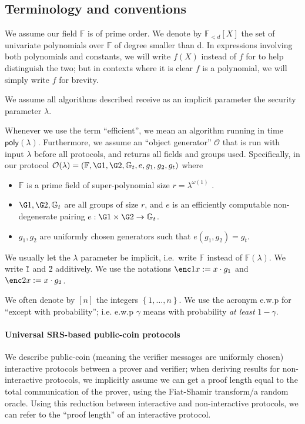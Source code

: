 \documentclass[11pt]{article} %
\newcommand{\Gt}{\ensuremath{{\mathbb G}_t}\xspace}
\newcommand{\F}{\ensuremath{\mathbb F}\xspace}
\newcommand{\defeq}{:=}
\newcommand{\set}[1]{\ensuremath{\left\{#1\right\}}\xspace}
\newcommand{\polysofdeg}[1]{\ensuremath{\F_{< #1}[X]}\xspace}
\newcommand{\obgen}{\ensuremath{\mathcal O}\xspace}
\newcommand{\poly}{\ensuremath{\mathsf{poly(\lambda)}}\xspace}
\begin{document}
\subsection{Terminology and conventions}\label{sec:terminology}
We assume our field \F is of prime order.
We denote by \polysofdeg{d} the set of univariate polynomials over \F of degree smaller than d.
In expressions involving both polynomials and constants, we will write $f(X)$ instead of $f$ for
to help distinguish the two; but in contexts where it is clear $f$ is a polynomial, we will simply write $f$ for brevity.

We assume all algorithms described receive as an implicit parameter the security parameter $\lambda$.

Whenever we use the term “efficient”, we mean an algorithm running in time \poly. Furthermore,
we assume an “object generator” \obgen that is run with input $\lambda$ before all protocols, and returns all fields and groups used. Specifically, in our protocol $\obgen(\lambda) = (\F, \G1, \G2, \Gt, e, g_1, g_2,g_t)$ where
\begin{itemize}
\item \F is a prime field of super-polynomial size $r = \lambda^{\omega(1)}$
.
\item $\G1,\G2,\Gt$ are all groups of size $r$, and $e$ is an efficiently computable non-degenerate pairing
$e : \G1 \times \G2 \to \Gt$.
\item $g_1,g_2$ are uniformly chosen generators such that $e(g_1, g_2) = g_t$.
\end{itemize}
We usually let the $\lambda$ parameter be implicit, i.e.\ write \F instead of $\F(\lambda)$.
We write \G1 and \G2 additively. We use the notations $\enc1{x}\defeq x\cdot g_1$ and $\enc2{x}\defeq x\cdot g_2$.

We often denote by $[n]$ the integers \set{1,\ldots,n}.
We use the acronym e.w.p for ``except with probability''; i.e. e.w.p $\gamma$ means with probability \emph{at least} $1-\gamma$.

\paragraph{Universal SRS-based public-coin protocols}
We describe public-coin (meaning the verifier messages are uniformly chosen) interactive protocols between a prover and verifier; when deriving results for non-interactive protocols, we implicitly assume we can get a proof length equal to the total communication of the prover, using the Fiat-Shamir transform/a random oracle. Using this reduction between interactive and non-interactive protocols, we can refer to the ``proof length'' of an interactive protocol.
\end{document}
